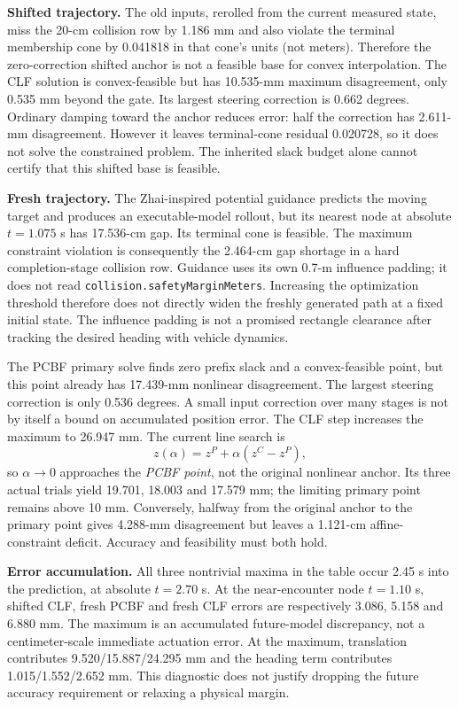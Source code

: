 \documentclass[10pt]{article}
\begin{document}
\textbf{Shifted trajectory.} The old inputs, rerolled from the current measured
state, miss the 20-cm collision row by 1.186 mm and also violate the terminal
membership cone by 0.041818 in that cone's units (not meters). Therefore the
zero-correction shifted anchor is not a feasible base for convex interpolation.
The CLF solution is convex-feasible but has 10.535-mm maximum disagreement,
only 0.535 mm beyond the gate. Its largest steering correction is 0.662 degrees.
Ordinary damping toward the anchor reduces error: half the correction has
2.611-mm disagreement. However it leaves terminal-cone residual 0.020728,
so it does not solve the constrained problem. The inherited slack budget
alone cannot certify that this shifted base is feasible.

\textbf{Fresh trajectory.} The Zhai-inspired potential guidance predicts the
moving target and produces an executable-model rollout, but its nearest node
at absolute $t=1.075$ s has 17.536-cm gap. Its terminal cone is feasible.
The maximum constraint violation is consequently the 2.464-cm gap shortage in
a hard completion-stage collision row. Guidance uses its own 0.7-m influence
padding; it does not read \texttt{collision.safetyMarginMeters}. Increasing
the optimization threshold therefore does not directly widen the freshly
generated path at a fixed initial state. The influence padding is not a promised
rectangle clearance after tracking the desired heading with vehicle dynamics.

The PCBF primary solve finds zero prefix slack and a convex-feasible point,
but this point already has 17.439-mm nonlinear disagreement. The largest
steering correction is only 0.536 degrees. A small input correction over many
stages is not by itself a bound on accumulated position error.
The CLF step increases the maximum to 26.947 mm. The current line search is
\[
 z(\alpha)=z^{P}+\alpha(z^{C}-z^{P}),
\]
so $\alpha\to0$ approaches the \emph{PCBF point}, not the original nonlinear
anchor. Its three actual trials yield 19.701, 18.003 and 17.579 mm; the limiting
primary point remains above 10 mm. Conversely, halfway from the original
anchor to the primary point gives 4.288-mm disagreement but leaves a
1.121-cm affine-constraint deficit. Accuracy and feasibility must both hold.

\textbf{Error accumulation.} All three nontrivial maxima in the table occur
2.45 s into the prediction, at absolute $t=2.70$ s. At the near-encounter
node $t=1.10$ s, shifted CLF, fresh PCBF and fresh CLF errors are respectively
3.086, 5.158 and 6.880 mm. The maximum is an accumulated future-model discrepancy,
not a centimeter-scale immediate actuation error. At the maximum, translation
contributes 9.520/15.887/24.295 mm and the heading term contributes
1.015/1.552/2.652 mm. This diagnostic does not justify dropping the future
accuracy requirement or relaxing a physical margin.
\end{document}
